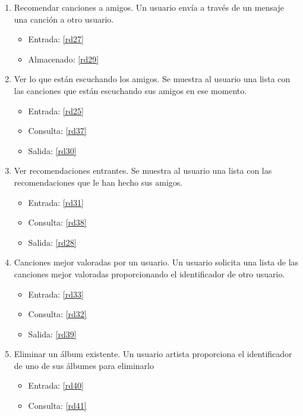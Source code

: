 \documentclass[12pt,a4paper]{article}
\begin{document}
\begin{enumerate}[label=\textnormal{RF\arabic*}]
	 \item Recomendar canciones a amigos. Un usuario envía a través de un mensaje una canción a otro usuario. \label{rf17}
	 	\begin{itemize}
			\item Entrada: \ref{rd27}
			\item Almacenado: \ref{rd29}
		\end{itemize}
	
	 \item Ver lo que están escuchando los amigos. Se muestra al usuario una lista con las canciones que están escuchando sus amigos en ese momento. \label{rf18}
	 	\begin{itemize}
			\item Entrada: \ref{rd25}
			\item Consulta: \ref{rd37}
			\item Salida: \ref{rd30}
		\end{itemize}

	 \item Ver recomendaciones entrantes. Se muestra al usuario una lista con las recomendaciones que le han hecho sus amigos. \label{rf19}
	 	\begin{itemize}
			\item Entrada: \ref{rd31}
			\item Consulta: \ref{rd38}
			\item Salida: \ref{rd28}
		\end{itemize}

	 \item Canciones mejor valoradas por un usuario. Un usuario solicita una lista de las canciones mejor valoradas proporcionando el identificador de otro usuario. \label{rf20}
	 	\begin{itemize}
			\item Entrada:  \ref{rd33}
			\item Consulta: \ref{rd32}
			\item Salida: \ref{rd39}
		\end{itemize}
		
	 \item Eliminar un álbum existente. Un usuario artista proporciona el identificador de uno de sus álbumes para eliminarlo \label{rf21}
	 	\begin{itemize}
			\item Entrada:  \ref{rd40}
			\item Consulta: \ref{rd41}
		\end{itemize}	
   
\end{enumerate}
\end{document}
